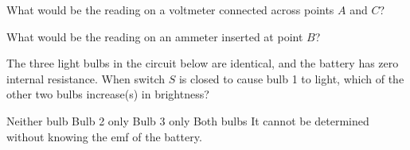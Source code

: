 \documentclass[12pt]{../oss-classkick-exam}
\begin{document}
\begin{questions}
  \uplevel{\rule{\linewidth}{.5pt}}

  \question What would be the reading on a voltmeter connected across points
  $A$ and $C$?
  \label{rcirc1}

  \question What would be the reading on an ammeter inserted at point $B$?
  \label{rcirc2}
  


  \question The three light bulbs in the circuit below are identical, and the
  battery has zero internal resistance. When switch $S$ is closed to cause
  bulb 1 to light, which of the other two bulbs increase(s) in brightness?

  \begin{minipage}{.3\linewidth}
  \end{minipage}
  \begin{minipage}{.64\linewidth}
    \begin{choices}
      \choice Neither bulb
      \choice Bulb 2 only
      \choice Bulb 3 only
      \choice Both bulbs
      \choice It cannot be determined without knowing the emf of the battery.
    \end{choices}
  \end{minipage}
  

\end{questions}
\end{document}
